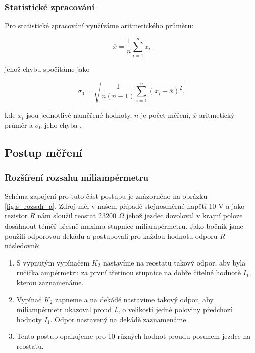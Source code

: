 \documentclass[english]{article}
\begin{document}
\subsubsection{Statistické zpracování}

Pro statistické zpracování využíváme aritmetického průměru:

\begin{equation} \label{eq:aritmeticky_prumer}
\overline{x} = \frac{1}{n}\sum\limits_{i=1}^{n}x_i
\end{equation}

jehož chybu spočítáme jako 

\begin{equation} \label{eq:chyba_aritmetickeho_prumeru}
\sigma_0 = \sqrt{\frac{1}{n(n-1)} \sum\limits_{i=1}^{n}\left( x_i - \overline{x} \right)^2 },
\end{equation}

kde $ x_i $ jsou jednotlivé naměřené hodnoty, $ n $ je počet měření, $ \overline{x} $ aritmetický průměr a $ \sigma_0 $ jeho chyba \cite{bib:pra_chyby_o_2}.

\subsection{Postup měření}

\subsubsection{Rozšíření rozsahu miliampérmetru}
Schéma zapojení pro tuto část postupu je znázorněno na obrázku \ref{fig:s_rozsah_a}. Zdroj měl v našem případě stejnosměrné napětí 10 V a jako rezistor $R$ nám sloužil reostat 23200 $\Omega$ jehož jezdec dovoloval v krajní poloze dosáhnout téměř přesně maxima stupnice miliampérmetru. Jako bočník jsme použili odporovou dekádu a postupovali pro každou hodnotu odporu $R$ následovně:
\begin{enumerate}
	\item S vypnutým vypínačem $K_{2}$ nastavíme na reostatu takový odpor, aby byla ručička ampérmetru za první třetinou stupnice na dobře čitelné hodnotě $I_{1}$, kterou zaznamenáme.
	\item Vypínač $K_{2}$ zapneme a na dekádě nastavíme takový odpor, aby miliampérmetr ukazoval proud $I_{2}$ o velikosti jedné poloviny předchozí hodnoty $I_{1}$. Odpor nastavený na dekádě zaznamenáme.
	\item Tento postup opakujeme pro 10 různých hodnot proudu posunem jezdce na reostatu. 	
\end{enumerate}
\end{document}
